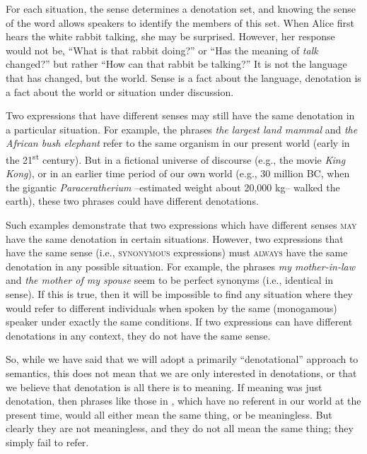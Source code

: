 For each situation, the sense determines a denotation set, and knowing the sense of the word allows speakers to identify the members of this set. When Alice first hears the white rabbit talking, she may be surprised. However, her response would not be, “What is that rabbit doing?” or “Has the meaning of \textit{talk} changed?” but rather “How can that rabbit be talking?” It is not the language that has changed, but the world. Sense is a fact about the language, denotation is a fact about the world or situation under discussion.



Two expressions that have different senses may still have the same denotation in a particular situation. For example, the phrases \textit{the largest land mammal} and \textit{the African bush elephant} refer to the same organism in our present world (early in the 21\textsuperscript{st} century). But in a fictional universe of discourse (e.g., the movie \textit{King Kong}), or in an earlier time period of our own world (e.g., 30 million BC, when the gigantic \textit{Paraceratherium} –estimated weight about 20,000 kg– walked the earth), these two phrases could have different denotations.



Such examples demonstrate that two expressions which have different senses \textsc{may} have the same denotation in certain situations. However, two expressions that have the same sense (i.e., \textsc{synonymous} expressions) must \textsc{always} have the same denotation in any possible situation. For example, the phrases \textit{my mother-in-law} and \textit{the mother of my spouse} seem to be perfect synonyms (i.e., identical in sense). If this is true, then it will be impossible to find any situation where they would refer to different individuals when spoken by the same (monogamous) speaker under exactly the same conditions. If two expressions can have different denotations in any context, they do not have the same sense.



So, while we have said that we will adopt a primarily “denotational” approach to semantics, this does not mean that we are only interested in denotations, or that we believe that denotation is all there is to meaning. If meaning was just denotation, then phrases like those in , which have no referent in our world at the present time, would all either mean the same thing, or be meaningless. But clearly they are not meaningless, and they do not all mean the same thing; they simply fail to refer. 


